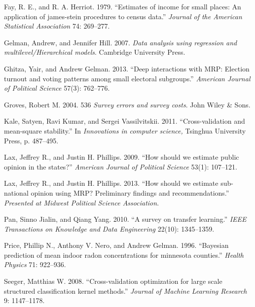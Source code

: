 \documentclass[11pt,article,oneside]{memoir}
\begin{document}
Fay, R. E., and R. A. Herriot. 1979. ``Estimates of income for small
places: An application of james-stein procedures to census data.''
\emph{Journal of the American Statistical Association} 74: 269--277.

Gelman, Andrew, and Jennifer Hill. 2007. \emph{Data analysis using
regression and multilevel/Hierarchical models}. Cambridge University
Press.

Ghitza, Yair, and Andrew Gelman. 2013. ``Deep interactions with MRP:
Election turnout and voting patterns among small electoral subgroups.''
\emph{American Journal of Political Science} 57(3): 762--776.

Groves, Robert M. 2004. 536 \emph{Survey errors and survey costs}. John
Wiley \& Sons.

Kale, Satyen, Ravi Kumar, and Sergei Vassilvitskii. 2011.
``Cross-validation and mean-square stability.'' In \emph{Innovations in
computer science,} Tsinghua University Press, p. 487--495.

Lax, Jeffrey R., and Justin H. Phillips. 2009. ``How should we estimate
public opinion in the states?'' \emph{American Journal of Political
Science} 53(1): 107--121.

Lax, Jeffrey R., and Justin H. Phillips. 2013. ``How should we estimate
sub-national opinion using MRP? Preliminary findings and
recommendations.'' \emph{Presented at Midwest Political Science
Association}.

Pan, Sinno Jialin, and Qiang Yang. 2010. ``A survey on transfer
learning.'' \emph{IEEE Transactions on Knowledge and Data Engineering}
22(10): 1345--1359.

Price, Phillip N., Anthony V. Nero, and Andrew Gelman. 1996. ``Bayesian
prediction of mean indoor radon concentrations for minnesota counties.''
\emph{Health Physics} 71: 922--936.

Seeger, Matthias W. 2008. ``Cross-validation optimization for large
scale structured classification kernel methods.'' \emph{Journal of
Machine Learning Research} 9: 1147--1178.
\end{document}
